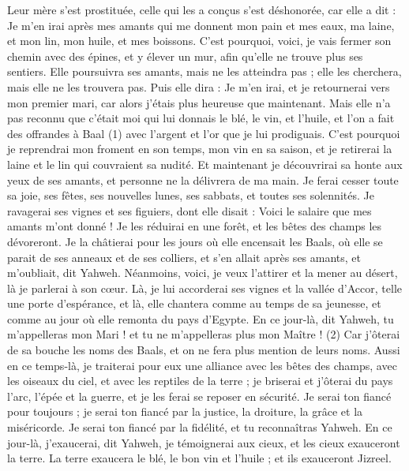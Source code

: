\begin{multicols}{2}
Leur mère s'est prostituée, celle qui les a conçus s'est déshonorée, car elle a dit : Je m'en irai après mes amants qui me donnent mon pain et mes eaux, ma laine, et mon lin, mon huile, et mes boissons.
C'est pourquoi, voici, je vais fermer son chemin avec des épines, et y élever un mur, afin qu’elle ne trouve plus ses sentiers.
Elle poursuivra ses amants, mais ne les atteindra pas ; elle les cherchera, mais elle ne les trouvera pas. Puis elle dira : Je m'en irai, et je retournerai vers mon premier mari, car alors j'étais plus heureuse que maintenant.
Mais elle n'a pas reconnu que c'était moi qui lui donnais le blé, le vin, et l'huile, et l’on a fait des offrandes à Baal (1) avec l’argent et l’or que je lui prodiguais.
C'est pourquoi je reprendrai mon froment en son temps, mon vin en sa saison, et je retirerai la laine et le lin qui couvraient sa nudité.
Et maintenant je découvrirai sa honte aux yeux de ses amants, et personne ne la délivrera de ma main.
Je ferai cesser toute sa joie, ses fêtes, ses nouvelles lunes, ses sabbats, et toutes ses solennités.
Je ravagerai ses vignes et ses figuiers, dont elle disait : Voici le salaire que mes amants m'ont donné ! Je les réduirai en une forêt, et les bêtes des champs les dévoreront.
Je la châtierai pour les jours où elle encensait les Baals, où elle se parait de ses anneaux et de ses colliers, et s'en allait après ses amants, et m'oubliait, dit Yahweh.
Néanmoins, voici, je veux l'attirer et la mener au désert, là je parlerai à son cœur.
Là, je lui accorderai ses vignes et la vallée d’Accor, telle une porte d’espérance, et là, elle chantera comme au temps de sa jeunesse, et comme au jour où elle remonta du pays d'Egypte.
En ce jour-là, dit Yahweh, tu m'appelleras mon Mari ! et tu ne m'appelleras plus mon Maître ! (2)
Car j'ôterai de sa bouche les noms des Baals, et on ne fera plus mention de leurs noms.
Aussi en ce temps-là, je traiterai pour eux une alliance avec les bêtes des champs, avec les oiseaux du ciel, et avec les reptiles de la terre ; je briserai et j'ôterai du pays l'arc, l'épée et la guerre, et je les ferai se reposer en sécurité.
Je serai ton fiancé pour toujours ; je serai ton fiancé par la justice, la droiture, la grâce et la miséricorde.
Je serai ton fiancé par la fidélité, et tu reconnaîtras Yahweh.
En ce jour-là, j’exaucerai, dit Yahweh, je témoignerai aux cieux, et les cieux exauceront la terre.
La terre exaucera le blé, le bon vin et l'huile ; et ils exauceront Jizreel.

\end{multicols}

